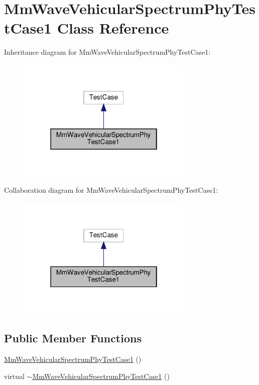 \hypertarget{classMmWaveVehicularSpectrumPhyTestCase1}{}\section{Mm\+Wave\+Vehicular\+Spectrum\+Phy\+Test\+Case1 Class Reference}
\label{classMmWaveVehicularSpectrumPhyTestCase1}


Inheritance diagram for Mm\+Wave\+Vehicular\+Spectrum\+Phy\+Test\+Case1\+:
\nopagebreak
\begin{figure}[H]
\begin{center}
\leavevmode
\includegraphics[width=238pt]{classMmWaveVehicularSpectrumPhyTestCase1__inherit__graph}
\end{center}
\end{figure}


Collaboration diagram for Mm\+Wave\+Vehicular\+Spectrum\+Phy\+Test\+Case1\+:
\nopagebreak
\begin{figure}[H]
\begin{center}
\leavevmode
\includegraphics[width=238pt]{classMmWaveVehicularSpectrumPhyTestCase1__coll__graph}
\end{center}
\end{figure}
\subsection*{Public Member Functions}
\begin{DoxyCompactItemize}
\item 
\hyperlink{classMmWaveVehicularSpectrumPhyTestCase1_acbe3f1ab9c9eb3aa37dc8501240df04a}{Mm\+Wave\+Vehicular\+Spectrum\+Phy\+Test\+Case1} ()
\item 
virtual \hyperlink{classMmWaveVehicularSpectrumPhyTestCase1_a4317647a74efd1008350f294484eab1b}{$\sim$\+Mm\+Wave\+Vehicular\+Spectrum\+Phy\+Test\+Case1} ()
\end{DoxyCompactItemize}


